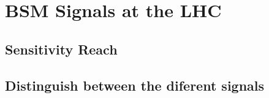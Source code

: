 \chapter{BSM Signals at the LHC}

\section{Sensitivity Reach}

\section{Distinguish between the diferent signals}